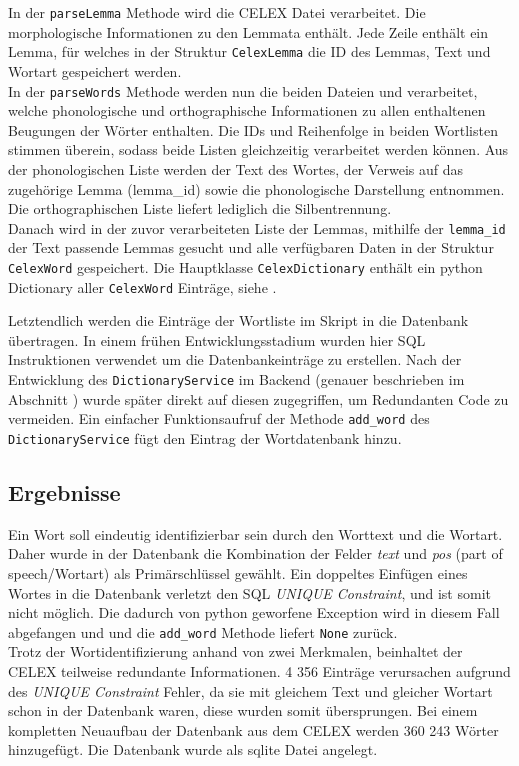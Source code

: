 
In der \texttt{parseLemma} Methode wird die CELEX Datei  verarbeitet. Die morphologische Informationen zu den Lemmata enthält. Jede Zeile enthält ein Lemma, für welches in der Struktur \texttt{CelexLemma} die ID des Lemmas, Text und Wortart gespeichert werden.\\

In der \texttt{parseWords} Methode werden nun die beiden Dateien  und  verarbeitet, welche phonologische und orthographische Informationen zu allen enthaltenen Beugungen der Wörter enthalten. Die IDs und Reihenfolge in beiden Wortlisten stimmen überein, sodass beide Listen gleichzeitig verarbeitet werden können. Aus der phonologischen Liste werden der Text des Wortes, der Verweis auf das zugehörige Lemma (lemma\_id) sowie die phonologische Darstellung entnommen. Die orthographischen Liste liefert lediglich die Silbentrennung.\\
Danach wird in der zuvor verarbeiteten Liste der Lemmas, mithilfe der \texttt{lemma\_id} der Text passende Lemmas gesucht und alle verfügbaren Daten in der Struktur \texttt{CelexWord} gespeichert. Die Hauptklasse \texttt{CelexDictionary} enthält ein python Dictionary aller \texttt{CelexWord} Einträge, siehe .

Letztendlich werden die Einträge der Wortliste im Skript  in die Datenbank übertragen. In einem frühen Entwicklungsstadium wurden hier SQL Instruktionen verwendet um die Datenbankeinträge zu erstellen. Nach der Entwicklung des \texttt{DictionaryService} im Backend (genauer beschrieben im Abschnitt ) wurde später direkt auf diesen zugegriffen, um Redundanten Code zu vermeiden. Ein einfacher Funktionsaufruf der Methode \texttt{add\_word} des \texttt{DictionaryService} fügt den Eintrag der Wortdatenbank hinzu.

\subsection{Ergebnisse}

Ein Wort soll eindeutig identifizierbar sein durch den Worttext und die Wortart. Daher wurde in der Datenbank die Kombination der Felder \textit{text} und \textit{pos} (part of speech/Wortart) als Primärschlüssel gewählt. Ein doppeltes Einfügen eines Wortes in die Datenbank verletzt den SQL \textit{UNIQUE Constraint}, und ist somit nicht möglich. Die dadurch von python geworfene Exception wird in diesem Fall abgefangen und und die \texttt{add\_word} Methode liefert \texttt{None} zurück.\\
Trotz der Wortidentifizierung anhand von zwei Merkmalen, beinhaltet der CELEX teilweise redundante Informationen. 4 356 Einträge verursachen aufgrund des \textit{UNIQUE Constraint} Fehler, da sie mit gleichem Text und gleicher Wortart schon in der Datenbank waren, diese wurden somit übersprungen. Bei einem kompletten Neuaufbau der Datenbank aus dem CELEX werden 360 243 Wörter hinzugefügt. Die Datenbank wurde als sqlite Datei  angelegt.


